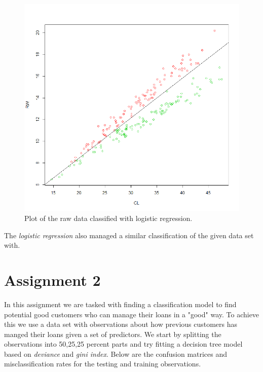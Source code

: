 \documentclass[a4paper,12pt]{article}
\begin{document}
\begin{figure}[H]
\centering
\begin{minipage}[]{0.5\textwidth}
  \includegraphics[width=\textwidth]{figures/logit_plot.png}  
  \caption{Plot of the raw data classified with logistic regression.\label{fig:logit_plot}}
 \end{minipage}
\end{figure}
The \textit{logistic regression} also managed a similar classification of the given data set with.

\section{Assignment 2}

In this assignment we are tasked with finding a classification model to find potential good customers who can manage their loans in a "good" way. To achieve this we use a data set with observations about how previous customers has manged their loans given a set of predictors. We start by splitting the observations into 50,25,25 percent parts and try fitting a decision tree model based on \textit{deviance} and \textit{gini index}. Below are the confusion matrices and misclassification rates for the testing and training observations.
\end{document}
